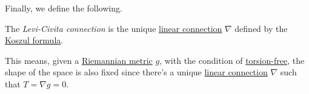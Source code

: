 Finally, we define the following.

\begin{definition}\label{def:Levi-Civita-connection}
	The \emph{Levi-Civita connection} is the unique \hyperref[def:linear-connection]{linear connection} \(\nabla \) defined by the \hyperref[eq:Koszul-formula]{Koszul formula}.
\end{definition}


\begin{remark}
	This means, given a \hyperref[def:Riemannian-metric]{Riemannian metric} \(g\), with the condition of \hyperref[def:torsion-free]{torsion-free}, the shape of the space is also fixed since there's a unique \hyperref[def:linear-connection]{linear connection} \(\nabla \) such that \(T = \nabla g = 0\).
\end{remark}